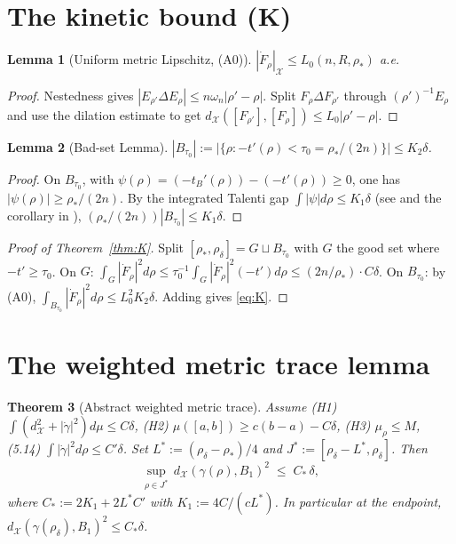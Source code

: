 \documentclass[11pt]{article}
\newtheorem{theorem}{Theorem}[section]
\newtheorem{lemma}[theorem]{Lemma}
\theoremstyle{definition}
\newcommand{\rstar}{\rho_{*}}
\newcommand{\X}{\mathcal X}
\begin{document}
\section{The kinetic bound (K)}\label{sec:K}

\begin{lemma}[Uniform metric Lipschitz, (A0)]\label{lem:A0}
$|\dot F_\rho|_\X\le L_0(n,R,\rstar)$ a.e.
\end{lemma}

\begin{proof}
Nestedness gives $|E_{\rho'}\Delta E_\rho|\le n\omega_n|\rho'-\rho|$.
Split $F_\rho\Delta F_{\rho'}$ through $(\rho')^{-1}E_\rho$ and use
the dilation estimate to get $d_\X([F_{\rho'}],[F_\rho])\le L_0|\rho'-\rho|$.
\end{proof}

\begin{lemma}[Bad-set Lemma]\label{lem:badset}
$|B_{\tau_0}|:=|\{\rho:-t'(\rho)<\tau_0=\rstar/(2n)\}|\le K_2\delta$.
\end{lemma}

\begin{proof}
On $B_{\tau_0}$, with
\(\psi(\rho)=(-t_B'(\rho))-(-t'(\rho))\ge0\), one has
$|\psi(\rho)|\ge\rstar/(2n)$. By the
integrated Talenti gap $\int|\psi|d\rho\le K_1\delta$
(see \cite{Talenti1976} and the corollary in
\cite{LevelSetIdentity}),
$(\rstar/(2n))|B_{\tau_0}|\le K_1\delta$.
\end{proof}

\begin{proof}[Proof of Theorem~\ref{thm:K}]
Split $[\rstar,\rho_\delta]=G\sqcup B_{\tau_0}$ with $G$ the good set
where $-t'\ge\tau_0$. On $G$:
$\int_G|\dot F_\rho|^2 d\rho\le\tau_0^{-1}\int_G|\dot F_\rho|^2(-t')d\rho
\le(2n/\rstar)\cdot C\delta$. On $B_{\tau_0}$: by (A0),
$\int_{B_{\tau_0}}|\dot F_\rho|^2 d\rho\le L_0^2 K_2\delta$.
Adding gives \eqref{eq:K}.
\end{proof}

\section{The weighted metric trace lemma}\label{sec:agent4}

\begin{theorem}[Abstract weighted metric trace]\label{thm:abstract-trace}
Assume (H1) $\int(d_\X^2+|\dot\gamma|^2)d\mu\le C\delta$, (H2)
$\mu([a,b])\ge c(b-a)-C\delta$, (H3) $\mu_\rho\le M$, (5.14)
$\int|\dot\gamma|^2 d\rho\le C'\delta$. Set
$L^*:=(\rho_\delta-\rstar)/4$ and $J^*:=[\rho_\delta-L^*,\rho_\delta]$.
Then
\[
   \sup_{\rho\in J^*}\,d_\X(\gamma(\rho),B_1)^2\;\le\;C_*\,\delta,
\]
where $C_*:=2K_1+2L^*C'$ with $K_1:=4C/(cL^*)$. In particular at the
endpoint, $d_\X(\gamma(\rho_\delta),B_1)^2\le C_*\delta$.
\end{theorem}
\end{document}
